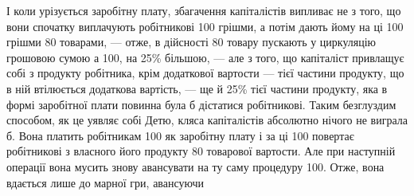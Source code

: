 І коли урізується заробітну плату, збагачення капіталістів випливає
не з того, що вони спочатку виплачують робітникові 100
грішми, а потім дають йому на ці 100 грішми 80
товарами, — отже, в дійсності 80 товару пускають у циркуляцію
грошовою сумою $а$ 100, на 25\% більшою, — але з того, що капіталіст
привлащує собі з продукту робітника, крім додаткової вартости — тієї
частини продукту, що в ній втілюється додаткова вартість, — ще й
25\% тієї частини продукту, яка в формі заробітної плати повинна була
б дістатися робітникові. Таким безглуздим способом, як це уявляє собі Детю,
кляса капіталістів абсолютно нічого не виграла б. Вона платить робітникам
100 як заробітну плату і за ці 100 повертає робітникові
з власного його продукту 80 товарової вартости. Але
при наступній операції вона мусить знову авансувати на ту саму процедуру
100. Отже, вона вдається лише до марної гри, авансуючи
\parbreak{}  %
